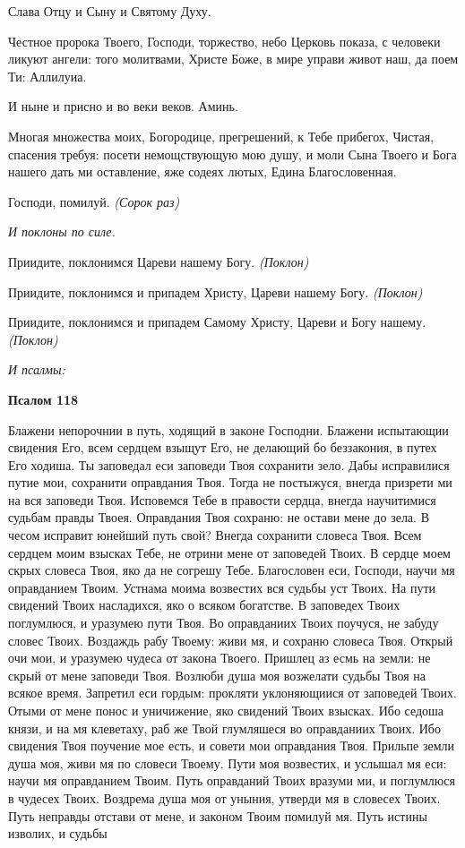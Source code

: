    Слава Отцу и Сыну и Святому Духу.


   Честное пророка Твоего, Господи, торжество, небо Церковь показа, с
человеки ликуют ангели: того молитвами, Христе Боже, в мире управи
живот наш, да поем Ти: Аллилуиа.


   И ныне и присно и во веки веков. Аминь.


   Многая множества моих, Богородице, прегрешений, к Тебе прибегох,
Чистая, спасения требуя: посети немощствующую мою душу, и моли Сына
Твоего и Бога нашего дать ми оставление, яже содеях лютых, Едина
Благословенная.



   Господи, помилуй. \itshape (Сорок раз)\normalfont{}


 \itshape И поклоны по силе.\normalfont{}


   Приидите, поклонимся Цареви нашему Богу. \itshape (Поклон)\normalfont{}


   Приидите, поклонимся и припадем Христу, Цареви нашему Богу.
\itshape (Поклон)\normalfont{}


   Приидите, поклонимся и припадем Самому Христу, Цареви и Богу
нашему. \itshape (Поклон)\normalfont{}


 \itshape И псалмы:\normalfont{}


 

\bfseries Псалом 118\normalfont{}

   Блажени непорочнии в путь, ходящий в законе Господни. Блажени
испытающии свидения Его, всем сердцем взыщут Его, не делающий бо
беззакония, в путех Его ходиша. Ты заповедал еси заповеди Твоя сохранити
зело. Дабы исправилися путие мои, сохранити оправдания Твоя. Тогда не
постыжуся, внегда призрети ми на вся заповеди Твоя. Исповемся Тебе в
правости сердца, внегда научитимися судьбам правды Твоея. Оправдания
Твоя сохраню: не остави мене до зела. В чесом исправит юнейший путь свой?
Внегда сохранити словеса Твоя. Всем сердцем моим взысках Тебе, не отрини
мене от заповедей Твоих. В сердце моем скрых словеса Твоя, яко да не
согрешу Тебе. Благословен еси, Господи, научи мя оправданием Твоим.
Устнама моима возвестих вся судьбы уст Твоих. На пути свидений Твоих
насладихся, яко о всяком богатстве. В заповедех Твоих поглумлюся, и
уразумею пути Твоя. Во оправданиих Твоих поучуся, не забуду словес
Твоих. Воздаждь рабу Твоему: живи мя, и сохраню словеса Твоя.
Открый очи мои, и уразумею чудеса от закона Твоего. Пришлец
аз есмь на земли: не скрый от мене заповеди Твоя. Возлюби душа
моя возжелати судьбы Твоя на всякое время. Запретил еси гордым:
прокляти уклоняющиися от заповедей Твоих. Отыми от мене понос и
уничижение, яко свидений Твоих взысках. Ибо седоша князи, и на мя
клеветаху, раб же Твой глумляшеся во оправданиих Твоих. Ибо свидения
Твоя поучение мое есть, и совети мои оправдания Твоя. Прильпе
земли душа моя, живи мя по словеси Твоему. Пути моя возвестих, и
услышал мя еси: научи мя оправданием Твоим. Путь оправданий Твоих
вразуми ми, и поглумлюся в чудесех Твоих. Воздрема душа моя от
уныния, утверди мя в словесех Твоих. Путь неправды отстави от
мене, и законом Твоим помилуй мя. Путь истины изволих, и судьбы

